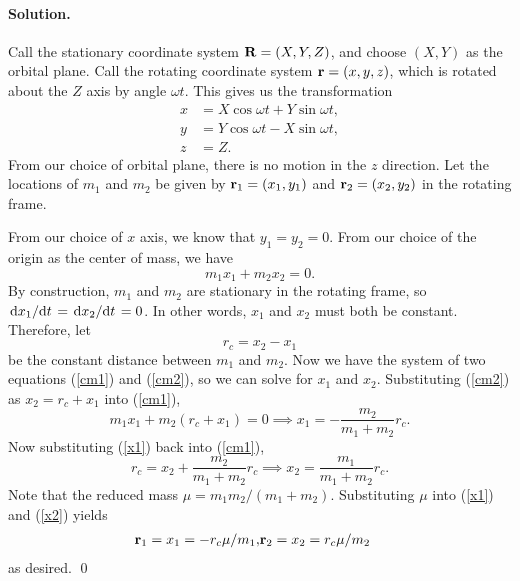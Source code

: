 \documentclass[11pt]{article}
\newcommand{\refeq}[1]{(\ref{#1})}
\newenvironment{solution}
{
    \paragraph{Solution.}
    \ignorespaces
}
{
    \bigskip
}
\begin{document}
\begin{solution}
	Call the stationary coordinate system $\mathbf{R} = (X, Y, Z)$, and choose $(X, Y)$ as the orbital plane.  Call the rotating coordinate system $\mathbf{r} = (x, y, z)$, which is rotated about the $Z$ axis by angle $\omega t$.  This gives us the transformation
	\begin{align}
		x &= X \cos{\omega t} + Y \sin{\omega t}, \label{oldx} \\
		y &= Y \cos{\omega t} - X \sin{\omega t},  \label{oldy} \\
		z &= Z.
	\end{align}
	From our choice of orbital plane, there is no motion in the $z$ direction.  Let the locations of $m_1$ and $m_2$ be given by $\mathbf{r}_1 = (x_1, y_1)$ and $\mathbf{r}_2 = (x_2, y_2)$ in the rotating frame.
	
	From our choice of $x$ axis, we know that $y_1 = y_2 = 0$.  From our choice of the origin as the center of mass, we have
	\begin{equation} \label{cm1}
		m_1 x_1 + m_2 x_2 = 0.
	\end{equation}
	By construction, $m_1$ and $m_2$ are stationary in the rotating frame, so $\dv*{x_1}{t} = \dv*{x_2}{t} = 0$.  In other words, $x_1$ and $x_2$ must both be constant.  Therefore, let
	\begin{equation} \label{cm2}
		r_c = x_2 - x_1
	\end{equation}
	be the constant distance between $m_1$ and $m_2$.  Now we have the system of two equations \refeq{cm1} and \refeq{cm2}, so we can solve for $x_1$ and $x_2$.  Substituting \refeq{cm2} as $x_2 = r_c + x_1$ into \refeq{cm1},
	\begin{equation} \label{x1}
		m_1 x_1 + m_2 (r_c + x_1) = 0 \implies x_1 = -\frac{m_2}{m_1 + m_2} r_c.
	\end{equation}
	Now substituting \refeq{x1} back into \refeq{cm1},
	\begin{equation} \label{x2}
		r_c = x_2 + \frac{m_2}{m_1 + m_2} r_c \implies x_2 = \frac{m_1}{m_1 + m_2} r_c.
	\end{equation}
	Note that the reduced mass $\mu = m_1 m_2 / (m_1 + m_2)$.  Substituting $\mu$ into \refeq{x1} and \refeq{x2} yields
	\begin{align} \label{result1a}
		\mathbf{r}_1 = x_1 = - r_c \mu / m_1, & \mathbf{r}_2 = x_2 = r_c \mu / m_2
	\end{align}
	as desired. \qed


\end{solution}
\end{document}

